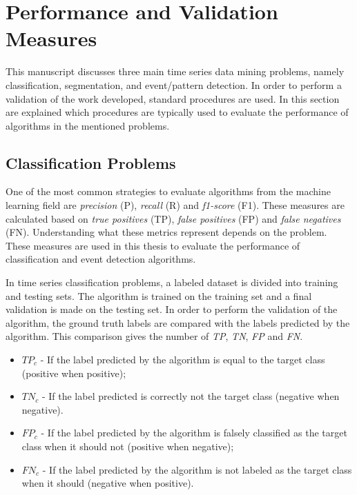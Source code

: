 %


\section{Performance and Validation Measures}

This manuscript discusses three main time series data mining problems, namely classification, segmentation, and event/pattern detection. In order to perform a validation of the work developed, standard procedures are used. In this section are explained which procedures are typically used to evaluate the performance of algorithms in the mentioned problems.

\subsection{Classification Problems}

One of the most common strategies to evaluate algorithms from the machine learning field are \textit{precision} (P), \textit{recall} (R) and \textit{f1-score} (F1). These measures are calculated based on \textit{true positives} (TP), \textit{false positives} (FP) and \textit{false negatives} (FN). Understanding what these metrics represent depends on the problem. These measures are used in this thesis to evaluate the performance of classification and event detection algorithms.
\par
In time series classification problems, a labeled dataset is divided into training and testing sets. The algorithm is trained on the training set and a final validation is made on the testing set. In order to perform the validation of the algorithm, the ground truth labels are compared with the labels predicted by the algorithm. This comparison gives the number of \textit{TP}, \textit{TN}, \textit{FP} and \textit{FN}. 

\begin{itemize}
    \item $TP_c$ - If the label predicted by the algorithm is equal to the target class (positive when positive);
    
    \item $TN_c$ - If the label predicted is correctly not the target class (negative when negative).

    \item $FP_c$ - If the label predicted by the algorithm is falsely classified as the target class when it should not (positive when negative);
    
    \item $FN_c$ - If the label predicted by the algorithm is not labeled as the target class when it should (negative when positive).
    
\end{itemize}



